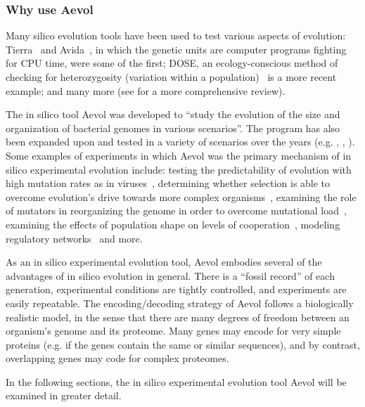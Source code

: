 \subsubsection{Why use Aevol}
Many silico evolution tools have been used to test various aspects of evolution: Tierra~\cite{Tierra-Ray} and Avida~\cite{Avida-Ofria}, in which the genetic units are computer programs fighting for CPU time, were some of the first; DOSE, an ecology-conscious method of checking for heterozygosity (variation within a population)~\cite{Castillo-DOSE} is a more recent example; and many more (see \cite{Mozhayskiy-In-Silico-Review} for a more comprehensive review). 

The in silico tool Aevol was developed to ``study the evolution of the size and organization of bacterial genomes in various scenarios''\cite{Batut.2013}. The program has also been expanded upon and tested in a variety of scenarios over the years (e.g. \cite{parsons2011selection}, \cite{misevic2012effects}, \cite{Miramontes.2016}). Some examples of experiments in which Aevol was the primary mechanism of in silico experimental evolution include: testing the predictability of evolution with high mutation rates as in viruses~\cite{beslon:hal-01577115}, determining whether selection is able to overcome evolution's drive towards more complex organisms~\cite{Liard.2018}, examining the role of mutators in reorganizing the genome in order to overcome mutational load~\cite{doi:10.1186/s12862-019-1507-z}, examining the effects of population shape on levels of cooperation~\cite{Miramontes.2016}, modeling regulatory networks~\cite{sanchezdehesa:hal-01502737} and more. 

As an in silico experimental evolution tool, Aevol embodies several of the advantages of in silico evolution in general. There is a ``fossil record'' of each generation, experimental conditions are tightly controlled, and experiments are easily repeatable. The encoding/decoding strategy of Aevol follows a biologically realistic model, in the sense that there are many degrees of freedom between an organism's genome and its proteome. Many genes may encode for very simple proteins (e.g. if the genes contain the same or similar sequences), and by contrast, overlapping genes may code for complex proteomes.
 
In the following sections, the in silico experimental evolution tool Aevol will be examined in greater detail. 
